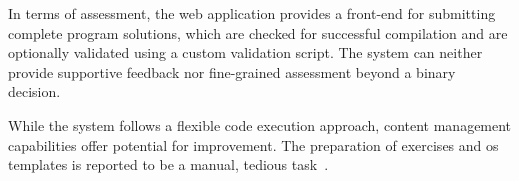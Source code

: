 In terms of assessment, the web application provides a front-end for submitting complete program solutions, which are checked for successful compilation and are optionally validated using a custom validation script. The system can neither provide supportive feedback nor fine-grained assessment beyond a binary decision.

While the system follows a flexible code execution approach, content management capabilities offer potential for improvement. The preparation of exercises and \gls{os} templates is reported to be a manual, tedious task~\cite{mueller2014security}.
